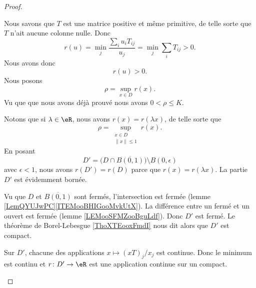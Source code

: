 \begin{proof}
\begin{subproof}
            Nous savons que \( T\) est une matrice positive et même primitive, de telle sorte que \( T\) n'ait aucune colonne nulle. Donc
            \begin{equation}
                r(u)=\min_j\frac{ \sum_iu_iT_{ij} }{ u_j }=\min_j\sum_iT_{ij}>0.
            \end{equation}
            Nous avons donc
            \begin{equation}
                r(u)>0.
            \end{equation}
            Nous posons
            \begin{equation}
                \rho=\sup_{x\in D}r(x).
            \end{equation}
            Vu que que nous avons déjà prouvé nous avons \( 0<\rho\leq K\).

            Notons que si \(\lambda\in \eR\), nous avons \( r(x)=r(\lambda x)\), de telle sorte que
            \begin{equation}
                \rho=\sup_{\substack{x\in D\\\| x \|\leq 1}}r(x).
            \end{equation}
        \spitem[Un compact]
            En posant
            \begin{equation}
                D'=\big( D\cap \overline{ B(0,1) } \big)\setminus B(0,\epsilon)
            \end{equation}
            avec \( \epsilon<1\), nous avons \( r(D')=r(D)\) parce que \( r(x)=r(\lambda x)\). La partie \( D'\) est évidemment bornée. 

            Vu que \( D\) et \( \overline{ B(0,1) }\) sont fermés, l'intersection est fermée (lemme \ref{LemQYUJwPC}\ref{ITEMooBHIGooMvkUtX}). La différence entre un fermé et un ouvert est fermée (lemme \ref{LEMooSFMZooBguLdf}). Donc \( D'\) est fermé. Le théorème de Borel-Lebesgue \ref{ThoXTEooxFmdI} nous dit alors que \( D'\) est compact.

            Sur \( D'\), chacune des applications \( x\mapsto (xT)_j/x_j\) est continue. Donc le minimum est continu et \( r\colon D'\to \eR\) est une application continue sur un compact.


\end{subproof}
\end{proof}
